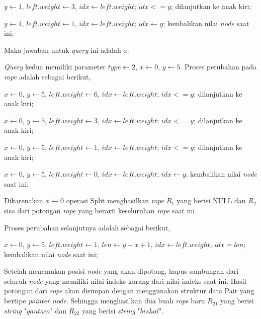 $y \gets 1$, $left.weight \gets 3$, $idx \gets left.weight$; $idx <= y$;
dilanjutkan ke anak kiri;

$y \gets 1$, $left.weight \gets 1$, $idx \gets left.weight$; $idx \gets y$;
kembalikan nilai \textit{node} saat ini;

Maka jawaban untuk \textit{query} ini adalah $a$. 

\textit{Query} kedua memiliki parameter $type \gets 2$, $x \gets 0$, $y \gets 5$. Proses perubahan pada \textit{rope} adalah sebagai berikut,

$x \gets 0$, $y \gets 5$, $left.weight \gets 6$, $idx \gets left.weight$; $idx <= y$;
dilanjutkan ke anak kiri;

$x \gets 0$, $y \gets 5$, $left.weight \gets 3$, $idx \gets left.weight$; $idx <= y$;
dilanjutkan ke anak kiri;

$x \gets 0$, $y \gets 5$, $left.weight \gets 1$, $idx \gets left.weight$; $idx <= y$;
dilanjutkan ke anak kiri;

$x \gets 0$, $y \gets 5$, $left.weight \gets 0$, $idx \gets left.weight$; $idx \gets y$;
kembalikan nilai \textit{node} saat ini;

Dikarenakan $x \gets 0$ operasi Split menghasilkan \textit{rope} $R_1$ yang berisi NULL dan $R_2$ sisa dari potongan \textit{rope} yang berarti keseluruhan \textit{rope} saat ini.

Proses perubahan selanjutnya adalah sebagai berikut,

$x \gets 0$, $y \gets 5$, $left.weight \gets 1$, $len \gets y - x + 1$, $idx \gets left.weight$; $idx = len$;
kembalikan nilai \textit{node} saat ini;

Setelah menemukan posisi \textit{node} yang akan dipotong, hapus sambungan dari seluruh \textit{node} yang memiliki nilai indeks kurang dari nilai indeks saat ini. Hasil potongan dari \textit{rope} akan disimpan dengan menggunakan struktur data Pair yang bertipe \textit{pointer node}. Sehingga menghasilkan dua buah \textit{rope} baru $R_{21}$ yang berisi \textit{string} "$gautam$" dan $R_{22}$ yang berisi \textit{string} "$bishal$".

